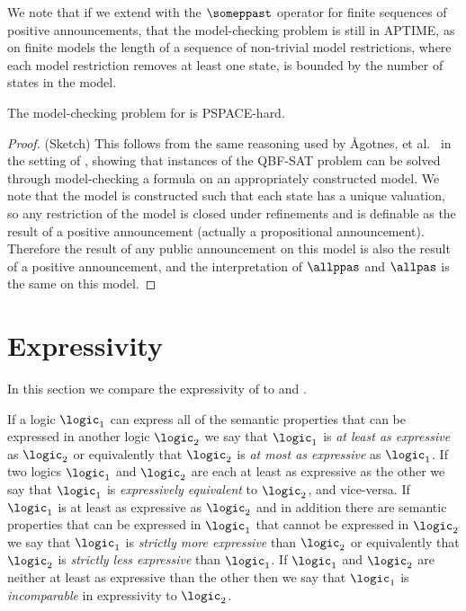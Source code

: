 We note that if we extend \logicPapalS{} with the $\someppast$ operator for finite sequences of positive announcements, that the model-checking problem is still in APTIME, as on finite models the length of a sequence of non-trivial model restrictions, where each model restriction removes at least one state, is bounded by the number of states in the model.

\begin{theorem}\label{papal-model-checking-pspace-hard}
    The model-checking problem for \logicPapalS{} is PSPACE-hard.
\end{theorem}

\begin{proof}{(Sketch)}
    This follows from the same reasoning used by Ågotnes, et al.~\cite{agotnes:2010} in the setting of \logicApalS{}, showing that instances of the QBF-SAT problem can be solved through model-checking a \langPapal{} formula on an appropriately constructed model.
    We note that the model is constructed such that each state has a unique valuation, so any restriction of the model is closed under refinements and is definable as the result of a positive announcement (actually a propositional announcement).
    Therefore the result of any public announcement on this model is also the result of a positive announcement, and the interpretation of $\allppas$ and $\allpas$ is the same on this model.
\end{proof}

\section{Expressivity}\label{expressivity}

In this section we compare the expressivity of \logicPapalS{} to \logicPalS{} and \logicApalS{}.

If a logic $\logic_1$ can express all of the semantic properties that can be expressed in another logic $\logic_2$ we say that $\logic_1$ is {\em at least as expressive} as $\logic_2$ or equivalently that $\logic_2$ is {\em at most as expressive} as $\logic_1$.
If two logics $\logic_1$ and $\logic_2$ are each at least as expressive as the other we say that $\logic_1$ is {\em expressively equivalent} to $\logic_2$, and vice-versa.
If $\logic_1$ is at least as expressive as $\logic_2$ and in addition there are semantic properties that can be expressed in $\logic_1$ that cannot be expressed in $\logic_2$ we say that $\logic_1$ is {\em strictly more expressive} than $\logic_2$ or equivalently that $\logic_2$ is {\em strictly less expressive} than $\logic_1$.
If $\logic_1$ and $\logic_2$ are neither at least as expressive than the other then we say that $\logic_1$ is {\em incomparable} in expressivity to $\logic_2$.

